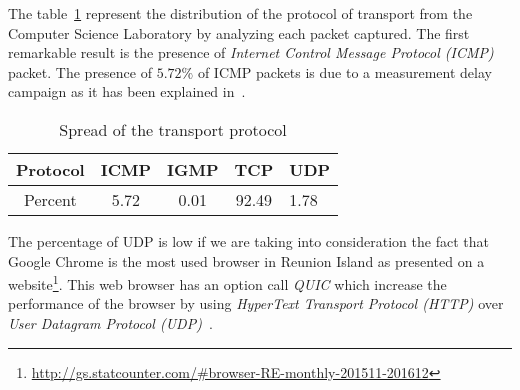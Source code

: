 \documentclass[10pt, conference, a4paper, twocolumns]{IEEEtran}
\def\yassine#1{\textbf{\textcolor{blue}{yassine : #1}}}
\begin{document}
The table~\ref{table:proto} represent the distribution of the protocol of transport from the Computer Science Laboratory by analyzing each packet captured. The first remarkable result is the presence of \emph{Internet Control Message Protocol (ICMP)} packet. %
The presence of $5.72\%$ of ICMP packets is due to a measurement delay campaign as it has been explained in~\cite{Noordally2016}.
\begin{table}[ht!]
\centering
\caption{Spread of the transport protocol}
\label{table:proto}
\begin{tabular}{|c|c|c|c|l|}
\hline
Protocol & ICMP & IGMP & TCP & UDP \\ \hline
Percent & 5.72 & 0.01 & 92.49 & 1.78 \\ \hline
\end{tabular}
\end{table}
The percentage of UDP is low if we are taking into consideration the fact that Google Chrome is the most used browser in Reunion Island as presented on a website\footnote{\url{http://gs.statcounter.com/#browser-RE-monthly-201511-201612}}. This web browser has an option call \emph{QUIC} which increase the performance of the browser by using \emph{HyperText Transport Protocol (HTTP)} over \emph{User Datagram Protocol (UDP)}~\cite{Carlucci2015}.


\end{document}
